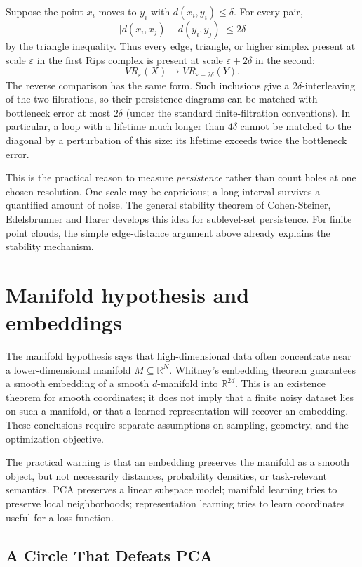 Suppose the point $x_i$ moves to $y_i$ with $d(x_i,y_i)\le\delta$. For every pair,
\[
 \bigl|d(x_i,x_j)-d(y_i,y_j)\bigr|\le2\delta
\]
by the triangle inequality. Thus every edge, triangle, or higher simplex present at scale $\varepsilon$ in the first Rips complex is present at scale $\varepsilon+2\delta$ in the second:
\[
 VR_\varepsilon(X)\longrightarrow VR_{\varepsilon+2\delta}(Y).
\]
The reverse comparison has the same form. Such inclusions give a $2\delta$-interleaving of the two filtrations, so their persistence diagrams can be matched with bottleneck error at most $2\delta$ (under the standard finite-filtration conventions). In particular, a loop with a lifetime much longer than $4\delta$ cannot be matched to the diagonal by a perturbation of this size: its lifetime exceeds twice the bottleneck error.

This is the practical reason to measure \emph{persistence} rather than count holes at one chosen resolution. One scale may be capricious; a long interval survives a quantified amount of noise. The general stability theorem of Cohen-Steiner, Edelsbrunner and Harer develops this idea for sublevel-set persistence. For finite point clouds, the simple edge-distance argument above already explains the stability mechanism.

\section{Manifold hypothesis and embeddings}

The manifold hypothesis says that high-dimensional data often concentrate near a lower-dimensional manifold $M\subseteq \mathbb R^N$.  Whitney's embedding theorem guarantees a smooth embedding of a smooth $d$-manifold into $\mathbb R^{2d}$. This is an existence theorem for smooth coordinates; it does not imply that a finite noisy dataset lies on such a manifold, or that a learned representation will recover an embedding. These conclusions require separate assumptions on sampling, geometry, and the optimization objective.

The practical warning is that an embedding preserves the manifold as a smooth object, but not necessarily distances, probability densities, or task-relevant semantics.  PCA preserves a linear subspace model; manifold learning tries to preserve local neighborhoods; representation learning tries to learn coordinates useful for a loss function.

\subsection*{A Circle That Defeats PCA}

